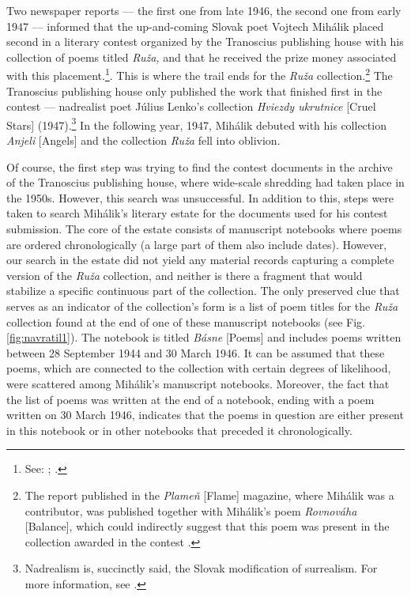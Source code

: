 \begin{paper}
Two newspaper reports –– the first one from late 1946, the second one
from early 1947 –– informed that the up-and-coming Slovak poet Vojtech
Mihálik placed second in a literary contest organized by the Tranoscius
publishing house with his collection of poems titled \emph{Ruža,} and that he
received the prize money associated with this placement.\footnote{See: \cite[4]{noauthor_vysledok_1946}; \cite[169]{noauthor_radost_1947}.}. This
is where the trail ends for the \emph{Ruža} collection.\footnote{The report
  published in the \emph{Plameň} [Flame] magazine, where Mihálik was
  a contributor, was published together with Mihálik's poem
  \emph{Rovnováha} [Balance], which could indirectly suggest that this
  poem was present in the collection awarded in the contest \mancite\parencite[169]{noauthor_radost_1947}.} The
Tranoscius publishing house only published the work that finished first
in the contest –– nadrealist poet Július Lenko's collection
\emph{Hviezdy ukrutnice} [Cruel Stars] (1947).\footnote{Nadrealism is, succinctly said, the Slovak modification of surrealism. For more information, see \parencite[167--168]{vlasin_slovnik_1977}.} In the following year,
1947, Mihálik debuted with his collection \emph{Anjeli} [Angels] and the
collection \emph{Ruža} fell into oblivion.

Of course, the first step was trying to find the contest documents in
the archive of the Tranoscius publishing house, where wide-scale
shredding had taken place in the 1950s. However, this search was
unsuccessful. In addition to this, steps were taken to search Mihálik's
literary estate for the documents used for his contest submission. The
core of the estate consists of manuscript notebooks where poems are
ordered chronologically (a large part of them also include dates).
However, our search in the estate did not yield any material records
capturing a complete version of the \emph{Ruža} collection, and neither
is there a fragment that would stabilize a specific continuous part of
the collection. The only preserved clue that serves as an indicator of
the collection's form is a list of poem titles for the \emph{Ruža}
collection found at the end of one of these manuscript
notebooks (see Fig. \ref{fig:navratil1}). The notebook is titled \emph{Básne} [Poems] and includes
poems written between 28 September 1944 and 30 March 1946. It can be
assumed that these poems, which are connected to the collection with
certain degrees of likelihood, were scattered among Mihálik's manuscript
notebooks. Moreover, the fact that the list of poems was written at the
end of a notebook, ending with a poem written on 30 March 1946, indicates
that the poems in question are either present in this notebook or in
other notebooks that preceded it chronologically.
  

\end{paper}
